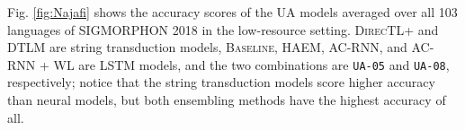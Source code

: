 Fig. \ref{fig:Najafi} shows the accuracy scores of the UA models averaged over all 103 languages of SIGMORPHON 2018 in the low-resource setting. \textsc{DirecTL+} and \textsc{DTLM} are string transduction models, \textsc{Baseline}, HAEM, AC-RNN, and AC-RNN + WL are LSTM models, and the two combinations are \texttt{UA-05} and \texttt{UA-08}, respectively; notice that the string transduction models score higher accuracy than neural models, but both ensembling methods have the highest accuracy of all.